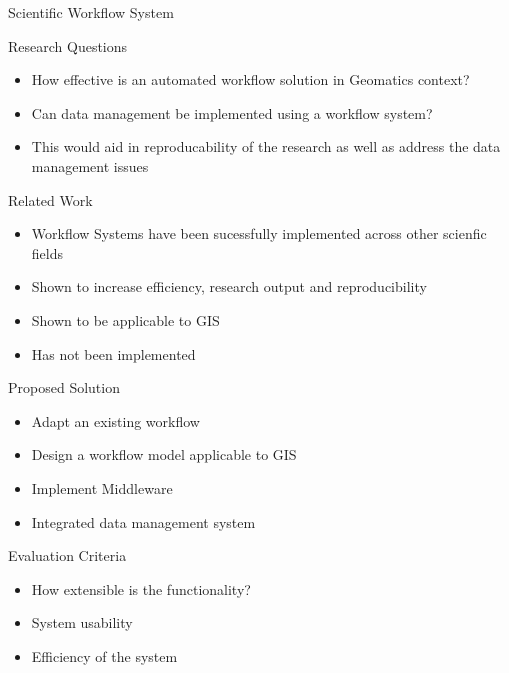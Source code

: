\documentclass{beamer}
\begin{document}
{\begin{frame}{Scientific Workflow System}
\end{frame}

\begin{frame}{Research Questions}

\begin{itemize}
\item How effective is an automated workflow solution in Geomatics context?
\item Can data management be implemented using a workflow system?
\item This would aid in reproducability of the research as well
      as address the data management issues
\end{itemize}
\end{frame}



\begin{frame}{Related Work}
\begin{itemize}
\item Workflow Systems have been sucessfully implemented across other scienfic
        fields
\item Shown to increase efficiency, research output and
      reproducibility
\item Shown to be applicable to GIS
\item Has not been implemented
\end{itemize}
\end{frame}


\begin{frame}{Proposed Solution}

\begin{itemize}
\item Adapt an existing workflow
\item Design a workflow model applicable to GIS
\item Implement Middleware
\item Integrated data management system
\end{itemize}
\end{frame}


\begin{frame}{Evaluation Criteria}
\begin{itemize}
\item How extensible is the functionality?
\item System usability
\item Efficiency of the system
\end{itemize}
\end{frame}
}
\end{document}
